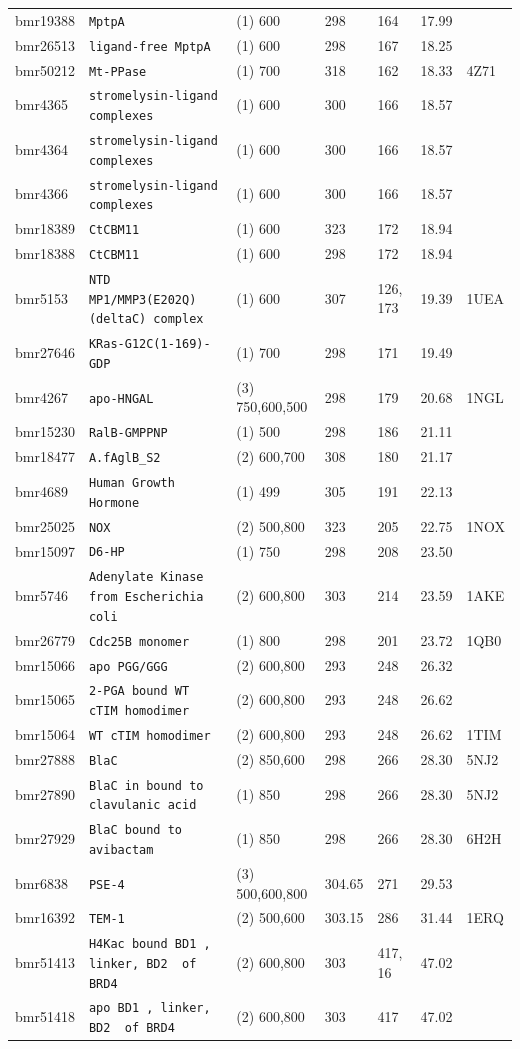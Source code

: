 \documentclass[showkeys,aps,prb,prepreint,amssymb, amsmath,nobibnotes]{article}
\begin{document}
\begin{tiny}
\begin{tabular}{lllllll}
bmr19388 & \verb|MptpA| & (1) 600& 298&  164& 17.99& \\
bmr26513 & \verb|ligand-free MptpA| & (1) 600& 298&  167& 18.25& \\
bmr50212 & \verb|Mt-PPase| & (1) 700& 318&  162& 18.33& 4Z71\\
bmr4365 & \verb|stromelysin-ligand complexes| & (1) 600& 300&  166& 18.57& \\
bmr4364 & \verb|stromelysin-ligand complexes| & (1) 600& 300&  166& 18.57& \\
bmr4366 & \verb|stromelysin-ligand complexes| & (1) 600& 300&  166& 18.57& \\
bmr18389 & \verb|CtCBM11| & (1) 600& 323&  172& 18.94& \\
bmr18388 & \verb|CtCBM11| & (1) 600& 298&  172& 18.94& \\
bmr5153 & \verb|NTD  MP1/MMP3(E202Q)(deltaC) complex| & (1) 600& 307&  126, 173& 19.39& 1UEA\\
bmr27646 & \verb|KRas-G12C(1-169)-GDP| & (1) 700& 298&  171& 19.49& \\
bmr4267 & \verb|apo-HNGAL | & (3) 750,600,500& 298&  179& 20.68& 1NGL\\
bmr15230 & \verb|RalB-GMPPNP| & (1) 500& 298&  186& 21.11& \\
bmr18477 & \verb|A.fAglB_S2| & (2) 600,700& 308&  180& 21.17& \\
bmr4689 & \verb|Human Growth Hormone| & (1) 499& 305&  191& 22.13& \\
bmr25025 & \verb|NOX| & (2) 500,800& 323&  205& 22.75& 1NOX\\
bmr15097 & \verb|D6-HP| & (1) 750& 298&  208& 23.50& \\
bmr5746 & \verb|Adenylate Kinase from Escherichia coli| & (2) 600,800& 303&  214& 23.59& 1AKE\\
bmr26779 & \verb|Cdc25B monomer| & (1) 800& 298&  201& 23.72& 1QB0\\
bmr15066 & \verb|apo PGG/GGG| & (2) 600,800& 293&  248& 26.32& \\
bmr15065 & \verb|2-PGA bound WT cTIM homodimer| & (2) 600,800& 293&  248& 26.62& \\
bmr15064 & \verb|WT cTIM homodimer| & (2) 600,800& 293&  248& 26.62& 1TIM\\
bmr27888 & \verb|BlaC| & (2) 850,600& 298&  266& 28.30& 5NJ2\\
bmr27890 & \verb|BlaC in bound to clavulanic acid| & (1) 850& 298&  266& 28.30& 5NJ2\\
bmr27929 & \verb|BlaC bound to avibactam| & (1) 850& 298&  266& 28.30& 6H2H\\
bmr6838 & \verb|PSE-4| & (3) 500,600,800& 304.65&  271& 29.53& \\
bmr16392 & \verb|TEM-1| & (2) 500,600& 303.15&  286& 31.44& 1ERQ\\
bmr51413 & \verb|H4Kac bound BD1 , linker, BD2  of BRD4| & (2) 600,800& 303&  417, 16& 47.02& \\
bmr51418 & \verb|apo BD1 , linker, BD2  of BRD4| & (2) 600,800& 303&  417& 47.02& \\
\end{tabular}


\end{tiny}\clearpage
\end{document}
